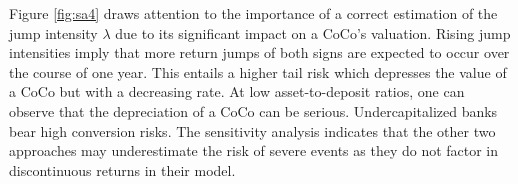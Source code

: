 Figure \ref{fig:sa4} draws attention to the importance of a correct estimation of the jump intensity $\lambda$ due to its significant impact on a CoCo's valuation. Rising jump intensities imply that more return jumps of both signs are expected to occur over the course of one year. This entails a higher tail risk which depresses the value of a CoCo but with a decreasing rate. At low asset-to-deposit ratios, one can observe that the depreciation of a CoCo can be serious. Undercapitalized banks bear high conversion risks. The sensitivity analysis indicates that the other two approaches may underestimate the risk of severe events as they do not factor in discontinuous returns in their model.